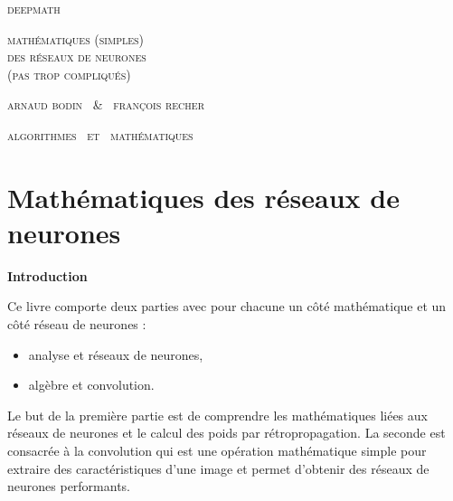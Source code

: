 
\pagestyle{empty}\thispagestyle{empty}
\vspace*{\fill}
\vspace*{5ex}
\begin{center}
	\fontsize{40}{40}\selectfont
	\textsc{deepmath}
	
	\vspace*{1ex}
	\textsc{\fontsize{24}{24}\selectfont 
	mathématiques (simples) \\
	des réseaux de neurones \\[-18pt]
	(pas trop compliqués)
	}
	
	\vspace*{2ex}
	
	\Large
	\textsc{arnaud bodin \ \& \ françois recher}

\end{center}
\vfill
\begin{center}
	\Large
	\textsc{algorithmes \  et \  mathématiques}
\end{center}
\begin{center}
\end{center}

\clearemptydoublepage

\thispagestyle{empty}

\vspace*{\fill}
\section*{Mathématiques des réseaux de neurones}

{\large\textbf{Introduction}}

Ce livre comporte deux parties avec pour chacune un côté \og{}mathématique\fg{} et un côté \og{}réseau de neurones\fg{} :
\begin{itemize}
  \item analyse et réseaux de neurones,
  \item algèbre et convolution.
\end{itemize}

Le but de la première partie est de comprendre les mathématiques liées aux réseaux de neurones et le calcul des poids par rétropropagation. La seconde est consacrée à la convolution qui est une opération mathématique simple pour extraire des caractéristiques d'une image et permet d'obtenir des réseaux de neurones performants. 

\medskip

